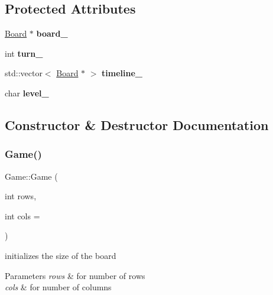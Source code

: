 \subsection*{Protected Attributes}
\begin{DoxyCompactItemize}
\item 
\mbox{\label{class_game_ade066636bda0bcc3501deb4981d9f400}} 
\hyperlink{class_board}{Board} $\ast$ {\bfseries board\+\_\+}
\item 
\mbox{\label{class_game_abc9f7b7f1ced3ddb136dbd25bebd4e2a}} 
int {\bfseries turn\+\_\+}
\item 
\mbox{\label{class_game_aacf1e01c0a9777117e730c8105fc339c}} 
std\+::vector$<$ \hyperlink{class_board}{Board} $\ast$ $>$ {\bfseries timeline\+\_\+}
\item 
\mbox{\label{class_game_a9fcfb58bda101e497f8845f01ba56582}} 
char {\bfseries level\+\_\+}
\end{DoxyCompactItemize}


\subsection{Constructor \& Destructor Documentation}
\mbox{\label{class_game_ac8c9003009977a0ecf0c35e0002f0f9e}} 
\subsubsection{\texorpdfstring{Game()}{Game()}}
{\footnotesize\ttfamily Game\+::\+Game (\begin{DoxyParamCaption}\item[{int}]{rows,  }\item[{int}]{cols = {} }\end{DoxyParamCaption})}



initializes the size of the board 


\begin{DoxyParams}{Parameters}
{\em rows} & for number of rows \\
\hline
{\em cols} & for number of columns \\
\hline
\end{DoxyParams}


